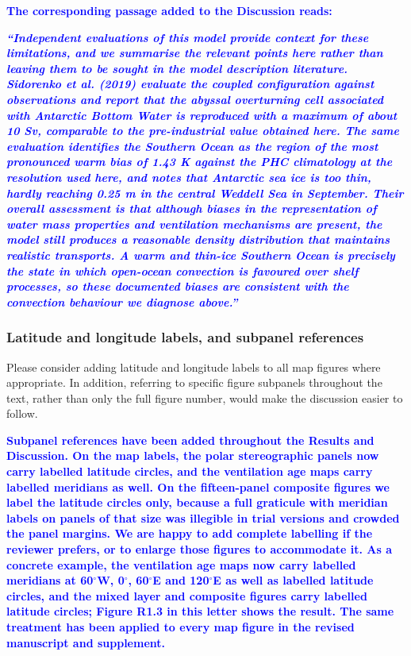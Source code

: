 \documentclass[pdflatex,sn-nature]{sn-jnl}
\begin{document}
\noindent\textcolor{blue}{\textbf{The corresponding passage added to the Discussion reads:}}


\medskip
\noindent\textcolor{blue}{\textbf{\textit{``Independent evaluations of this model provide context for these limitations, and we summarise the relevant points here rather than leaving them to be sought in the model description literature. Sidorenko et al. (2019) evaluate the coupled configuration against observations and report that the abyssal overturning cell associated with Antarctic Bottom Water is reproduced with a maximum of about 10 Sv, comparable to the pre-industrial value obtained here. The same evaluation identifies the Southern Ocean as the region of the most pronounced warm bias of 1.43 K against the PHC climatology at the resolution used here, and notes that Antarctic sea ice is too thin, hardly reaching 0.25 m in the central Weddell Sea in September. Their overall assessment is that although biases in the representation of water mass properties and ventilation mechanisms are present, the model still produces a reasonable density distribution that maintains realistic transports. A warm and thin-ice Southern Ocean is precisely the state in which open-ocean convection is favoured over shelf processes, so these documented biases are consistent with the convection behaviour we diagnose above.''}}}
\medskip

\subsubsection*{Latitude and longitude labels, and subpanel references}

\medskip
\noindent Please consider adding latitude and longitude labels to all map figures where appropriate. In addition, referring to specific figure subpanels throughout the text, rather than only the full figure number, would make the discussion easier to follow.
\medskip

\noindent\textcolor{blue}{\textbf{Subpanel references have been added throughout the Results and Discussion. On the map labels, the polar stereographic panels now carry labelled latitude circles, and the ventilation age maps carry labelled meridians as well. On the fifteen-panel composite figures we label the latitude circles only, because a full graticule with meridian labels on panels of that size was illegible in trial versions and crowded the panel margins. We are happy to add complete labelling if the reviewer prefers, or to enlarge those figures to accommodate it. As a concrete example, the ventilation age maps now carry labelled meridians at 60$^\circ$W, 0$^\circ$, 60$^\circ$E and 120$^\circ$E as well as labelled latitude circles, and the mixed layer and composite figures carry labelled latitude circles; Figure R1.3 in this letter shows the result. The same treatment has been applied to every map figure in the revised manuscript and supplement.}}
\end{document}

